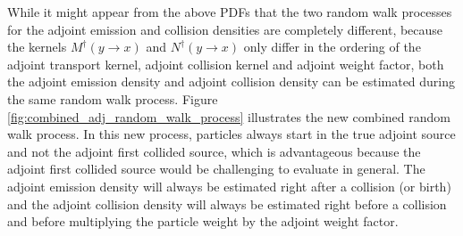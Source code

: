 While it might appear from the above PDFs that the two random walk processes
for the adjoint emission and collision densities are completely different,
because the kernels $M^{\dagger}(y \to x)$ and $N^{\dagger}(y \to x)$ only differ
in the ordering of the adjoint transport kernel, adjoint collision kernel and 
adjoint weight factor, both the adjoint emission density and adjoint collision
density can be estimated during the same random walk process. Figure 
\ref{fig:combined_adj_random_walk_process} illustrates the new combined random 
walk process. In this new process, particles always start in the true adjoint 
source and not the adjoint first collided source, which is advantageous because 
the adjoint first collided source would be challenging to evaluate in general. 
The adjoint emission density will always be estimated right after a collision 
(or birth) and the adjoint collision density will always be estimated right 
before a collision and before multiplying the particle weight by the adjoint 
weight factor. 
